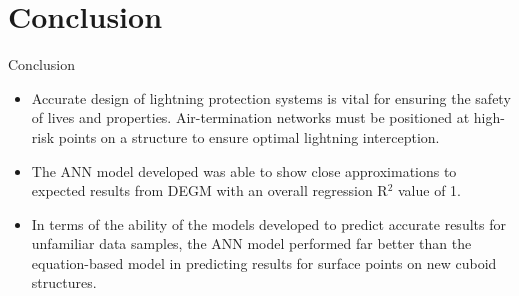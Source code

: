 \documentclass{beamer}
\begin{document}
\section{Conclusion}
\begin{frame}{Conclusion}
    \begin{block}{}
        \begin{itemize}\justifying
            \item Accurate design of lightning protection systems  is vital for ensuring the safety of lives and properties. Air-termination networks must be positioned at high-risk points on a structure to ensure optimal lightning interception.
            \item The ANN model developed was able to show close approximations to expected results from DEGM with an overall regression R$^2$ value of 1.
            \item In terms of the ability of the models developed to predict accurate results for unfamiliar data samples, the ANN model performed far better than the equation-based model in predicting results for surface points on new cuboid structures.
        \end{itemize}
    \end{block}
\end{frame}
\end{document}
